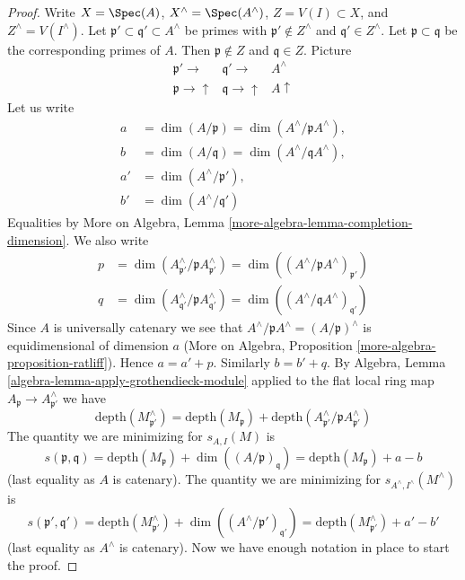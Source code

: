 \begin{proof}
Write $X = \Spec(A)$, $X^\wedge = \Spec(A^\wedge)$, $Z = V(I) \subset X$, and
$Z^\wedge = V(I^\wedge)$.
Let $\mathfrak p' \subset \mathfrak q' \subset A^\wedge$
be primes with $\mathfrak p' \not \in Z^\wedge$ and
$\mathfrak q' \in Z^\wedge$. Let $\mathfrak p \subset \mathfrak q$
be the corresponding primes of $A$. Then $\mathfrak p \not \in Z$
and $\mathfrak q \in Z$. Picture
$$
\begin{array}{ccc}\mathfrak p' \longrightarrow & \mathfrak q' \longrightarrow & A^\wedge \\ \mathfrak p \longrightarrow\uparrow & \mathfrak q \longrightarrow\uparrow & A \uparrow\end{array}
$$
Let us write
\begin{align*}
a & = \dim(A/\mathfrak p) = \dim(A^\wedge/\mathfrak pA^\wedge),\\
b & = \dim(A/\mathfrak q) = \dim(A^\wedge/\mathfrak qA^\wedge),\\
a' & = \dim(A^\wedge/\mathfrak p'),\\
b' & = \dim(A^\wedge/\mathfrak q')
\end{align*}
Equalities by
More on Algebra, Lemma \ref{more-algebra-lemma-completion-dimension}.
We also write
\begin{align*}
p & = \dim(A^\wedge_{\mathfrak p'}/\mathfrak p A^\wedge_{\mathfrak p'}) =
\dim((A^\wedge/\mathfrak p A^\wedge)_{\mathfrak p'}) \\
q & = \dim(A^\wedge_{\mathfrak q'}/\mathfrak p A^\wedge_{\mathfrak q'}) =
\dim((A^\wedge/\mathfrak q A^\wedge)_{\mathfrak q'})
\end{align*}
Since $A$ is universally catenary we see that
$A^\wedge/\mathfrak pA^\wedge = (A/\mathfrak p)^\wedge$
is equidimensional of dimension $a$
(More on Algebra, Proposition \ref{more-algebra-proposition-ratliff}).
Hence $a = a' + p$. Similarly $b = b' + q$.
By Algebra, Lemma \ref{algebra-lemma-apply-grothendieck-module}
applied to the flat local ring map
$A_\mathfrak p \to A^\wedge_{\mathfrak p'}$
we have
$$
\text{depth}(M^\wedge_{\mathfrak p'})
=
\text{depth}(M_\mathfrak p) +
\text{depth}(A^\wedge_{\mathfrak p'} / \mathfrak p A^\wedge_{\mathfrak p'})
$$
The quantity we are minimizing for $s_{A, I}(M)$ is
$$
s(\mathfrak p, \mathfrak q) =
\text{depth}(M_\mathfrak p) + \dim((A/\mathfrak p)_\mathfrak q) =
\text{depth}(M_\mathfrak p) + a - b
$$
(last equality as $A$ is catenary). The quantity we are minimizing
for $s_{A^\wedge, I^\wedge}(M^\wedge)$
is
$$
s(\mathfrak p', \mathfrak q') =
\text{depth}(M^\wedge_{\mathfrak p'}) +
\dim((A^\wedge/\mathfrak p')_{\mathfrak q'}) =
\text{depth}(M^\wedge_{\mathfrak p'}) + a' - b'
$$
(last equality as $A^\wedge$ is catenary).
Now we have enough notation in place to start the proof.


\end{proof}

